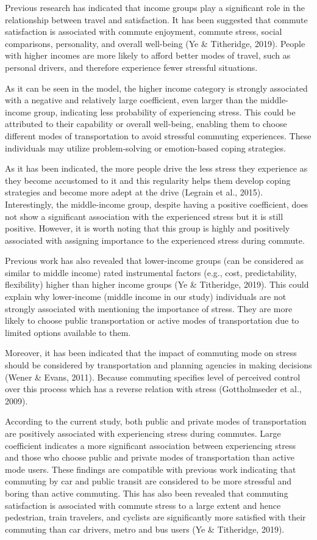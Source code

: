\documentclass[
11pt, %
oneside, %
english, %
singlespacing, %
]{macthesis} %
\begin{document}
Previous research has indicated that income groups play a significant role in the relationship between travel and satisfaction. It has been suggested that commute satisfaction is associated with commute enjoyment, commute stress, social comparisons, personality, and overall well-being (Ye \& Titheridge, 2019). People with higher incomes are more likely to afford better modes of travel, such as personal drivers, and therefore experience fewer stressful situations.

As it can be seen in the model, the higher income category is strongly associated with a negative and relatively large coefficient, even larger than the middle-income group, indicating less probability of experiencing stress. This could be attributed to their capability or overall well-being, enabling them to choose different modes of transportation to avoid stressful commuting experiences. These individuals may utilize problem-solving or emotion-based coping strategies.

As it has been indicated, the more people drive the less stress they experience as they become accustomed to it and this regularity helps them develop coping strategies and become more adept at the drive (Legrain et al., 2015). Interestingly, the middle-income group, despite having a positive coefficient, does not show a significant association with the experienced stress but it is still positive. However, it is worth noting that this group is highly and positively associated with assigning importance to the experienced stress during commute.

Previous work has also revealed that lower-income groups (can be considered as similar to middle income) rated instrumental factors (e.g., cost, predictability, flexibility) higher than higher income groups (Ye \& Titheridge, 2019). This could explain why lower-income (middle income in our study) individuals are not strongly associated with mentioning the importance of stress. They are more likely to choose public transportation or active modes of transportation due to limited options available to them.

Moreover, it has been indicated that the impact of commuting mode on stress should be considered by transportation and planning agencies in making decisions (Wener \& Evans, 2011). Because commuting specifies level of perceived control over this process which has a reverse relation with stress (Gottholmseder et al., 2009).

According to the current study, both public and private modes of transportation are positively associated with experiencing stress during commutes. Large coefficient indicates a more significant association between experiencing stress and those who choose public and private modes of transportation than active mode users. These findings are compatible with previous work indicating that commuting by car and public transit are considered to be more stressful and boring than active commuting. This has also been revealed that commuting satisfaction is associated with commute stress to a large extent and hence pedestrian, train travelers, and cyclists are significantly more satisfied with their commuting than car drivers, metro and bus users (Ye \& Titheridge, 2019).
\end{document}
